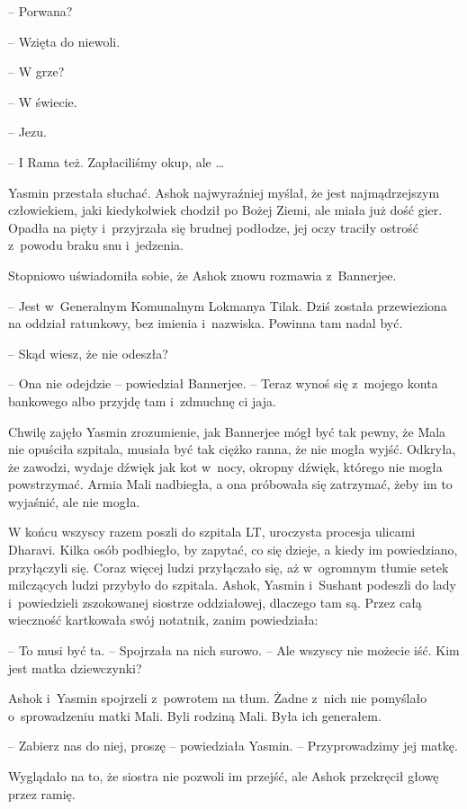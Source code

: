 \documentclass[oneside,polish,11pt,rmheadings]{mwbk}
\begin{document}
-- Porwana?

-- Wzięta do niewoli. 

-- W grze? 

-- W świecie. 

-- Jezu.

-- I Rama też. Zapłaciliśmy okup, ale \ldots 

Yasmin przestała słuchać. Ashok najwyraźniej myślał, że jest najmądrzejszym człowiekiem, jaki kiedykolwiek chodził po Bożej Ziemi, ale miała już dość gier. Opadła na pięty i~przyjrzała się brudnej podłodze, jej oczy traciły ostrość z~powodu braku snu i~jedzenia.

Stopniowo uświadomiła sobie, że Ashok znowu rozmawia z~Bannerjee.

-- Jest w~Generalnym Komunalnym Lokmanya Tilak. Dziś została przewieziona na oddział ratunkowy, bez imienia i~nazwiska. Powinna tam nadal być.

-- Skąd wiesz, że nie odeszła?

-- Ona nie odejdzie -- powiedział Bannerjee. -- Teraz wynoś się z~mojego konta bankowego albo przyjdę tam i~zdmuchnę ci jaja.

Chwilę zajęło Yasmin zrozumienie, jak Bannerjee mógł być tak pewny, że Mala nie opuściła szpitala, musiała być tak ciężko ranna, że nie mogła wyjść. Odkryła, że zawodzi, wydaje dźwięk jak kot w~nocy, okropny dźwięk, którego nie mogła powstrzymać. Armia Mali nadbiegła, a ona próbowała się zatrzymać, żeby im to wyjaśnić, ale nie mogła.

W końcu wszyscy razem poszli do szpitala LT, uroczysta procesja ulicami Dharavi. Kilka osób podbiegło, by zapytać, co się dzieje, a kiedy im powiedziano, przyłączyli się. Coraz więcej ludzi przyłączało się, aż w~ogromnym tłumie setek milczących ludzi przybyło do szpitala. Ashok, Yasmin i~Sushant podeszli do lady i~powiedzieli zszokowanej siostrze oddziałowej, dlaczego tam są. Przez całą wieczność kartkowała swój notatnik, zanim powiedziała: 

-- To musi być ta. -- Spojrzała na nich surowo. -- Ale wszyscy nie możecie iść. Kim jest matka dziewczynki?

Ashok i~Yasmin spojrzeli z~powrotem na tłum. Żadne z~nich nie pomyślało o~sprowadzeniu matki Mali. Byli rodziną Mali. Była ich generałem. 

-- Zabierz nas do niej, proszę -- powiedziała Yasmin. -- Przyprowadzimy jej matkę. 

Wyglądało na to, że siostra nie pozwoli im przejść, ale Ashok przekręcił głowę przez ramię. 
\end{document}
